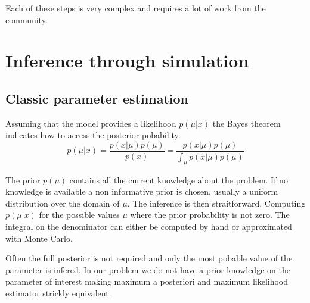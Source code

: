 Each of these steps is very complex and requires a lot of work from the community.







\section{Inference through simulation} %
\label{sec:inference_through_simulation}











\subsection{Classic parameter estimation} %
\label{sub:classic_parameter_estimation}



Assuming that the model provides a likelihood $p(\mu | x)$ the Bayes theorem indicates how to access the posterior pobability.
$$
    p(\mu | x) = \frac{p(x|\mu) p(\mu)}{p(x)} = \frac{p(x|\mu) p(\mu)}{\int_\mu p(x|\mu) p(\mu)}
$$

The prior $p(\mu)$ contains all the current knowledge about the problem. 
If no knowledge is available a non informative prior is chosen, usually a uniform distribution over the domain of $\mu$.
The inference is then straitforward.
Computing $p(\mu | x)$ for the possible values $\mu$ \ie where the prior probability is not zero.
The integral on the denominator can either be computed by hand or approximated with Monte Carlo.

Often the full posterior is not required and only the most pobable value of the parameter is infered.
In our problem we do not have a prior knowledge on the parameter of interest making maximum a posteriori and maximum likelihood estimator strickly equivalent.

